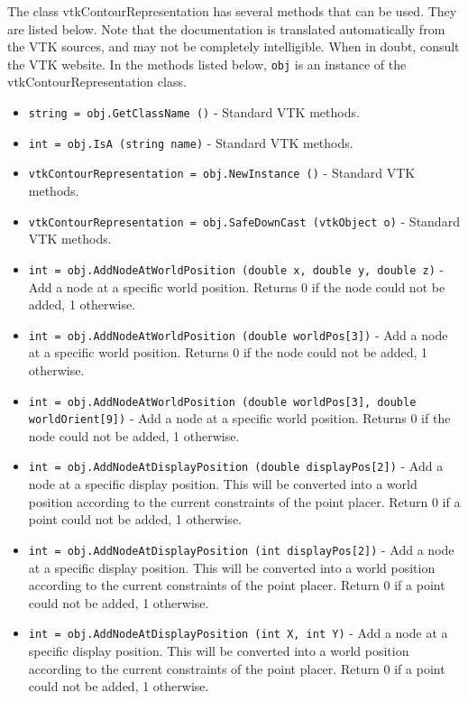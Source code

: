 The class vtkContourRepresentation has several methods that can be used.
  They are listed below.
Note that the documentation is translated automatically from the VTK sources,
and may not be completely intelligible.  When in doubt, consult the VTK website.
In the methods listed below, \verb|obj| is an instance of the vtkContourRepresentation class.
\begin{itemize}
\item  \verb|string = obj.GetClassName ()| -  Standard VTK methods.

\item  \verb|int = obj.IsA (string name)| -  Standard VTK methods.

\item  \verb|vtkContourRepresentation = obj.NewInstance ()| -  Standard VTK methods.

\item  \verb|vtkContourRepresentation = obj.SafeDownCast (vtkObject o)| -  Standard VTK methods.

\item  \verb|int = obj.AddNodeAtWorldPosition (double x, double y, double z)| -  Add a node at a specific world position. Returns 0 if the
 node could not be added, 1 otherwise.

\item  \verb|int = obj.AddNodeAtWorldPosition (double worldPos[3])| -  Add a node at a specific world position. Returns 0 if the
 node could not be added, 1 otherwise.

\item  \verb|int = obj.AddNodeAtWorldPosition (double worldPos[3], double worldOrient[9])| -  Add a node at a specific world position. Returns 0 if the
 node could not be added, 1 otherwise.

\item  \verb|int = obj.AddNodeAtDisplayPosition (double displayPos[2])| -  Add a node at a specific display position. This will be
 converted into a world position according to the current
 constraints of the point placer. Return 0 if a point could
 not be added, 1 otherwise.

\item  \verb|int = obj.AddNodeAtDisplayPosition (int displayPos[2])| -  Add a node at a specific display position. This will be
 converted into a world position according to the current
 constraints of the point placer. Return 0 if a point could
 not be added, 1 otherwise.

\item  \verb|int = obj.AddNodeAtDisplayPosition (int X, int Y)| -  Add a node at a specific display position. This will be
 converted into a world position according to the current
 constraints of the point placer. Return 0 if a point could
 not be added, 1 otherwise.


\end{itemize}
